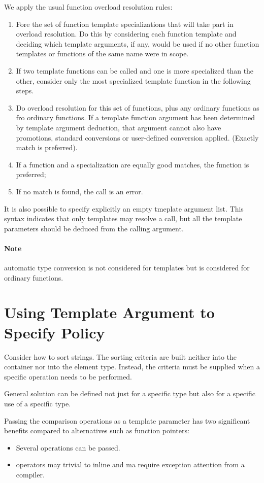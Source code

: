 \documentclass[a4paper,12pt]{book}
\begin{document}
We apply the usual function overload resolution rules:
\begin{enumerate}
	\item Fore the set of function template specializations that will take part in overload resolution. Do this by considering each function template and deciding which template arguments, if any, would be used if no other function templates or functions of the same name were in scope.
	\item If two template functions can be called and one is more specialized than the other, consider only the most specialized template function in the following steps.
	\item Do overload resolution for this set of functions, plus any ordinary functions as fro ordinary functions. If a template function argument has been determined by template argument deduction, that argument cannot also have promotions, standard conversions or user-defined conversion applied. (Exactly match is preferred).	
	\item If a function and a specialization are equally good matches, the function is preferred;
	\item If no match is found, the call is an error.
\end{enumerate}
It is also possible to specify explicitly an empty tmeplate argument list. This syntax indicates that only templates may resolve a call, but all the template parameters should be deduced from the calling argument.

\paragraph{Note} automatic type conversion is not considered for templates but is considered for ordinary functions.
\section{Using Template Argument to Specify Policy }
Consider how to sort strings. The sorting criteria are built neither into the container nor into the element type. Instead, the criteria must be supplied when a specific operation needs to be performed. 

General solution can be defined not just for a specific type but also for a specific use of a specific type. 

Passing the comparison operations as a template parameter has two significant benefits compared to alternatives such as function pointers:
\begin{itemize}
	\item Several operations can be passed.
	\item operators may trivial to inline and ma require exception attention from a compiler.
\end{itemize}
\end{document}
